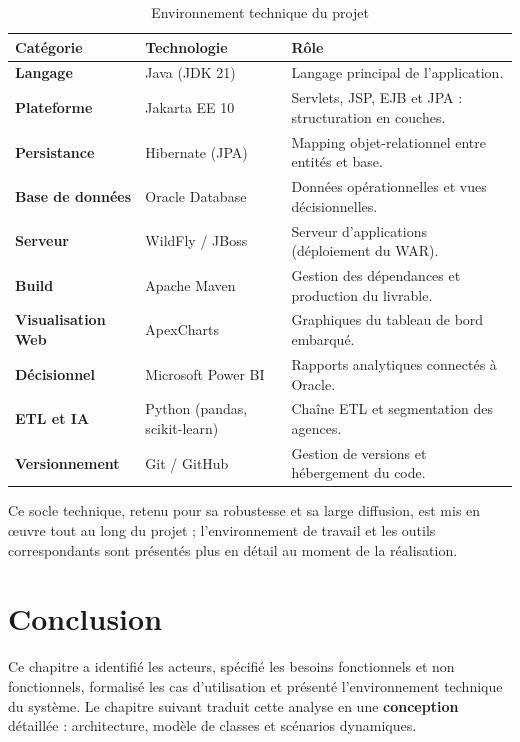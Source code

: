 \begin{table}[!htb]
\centering\small
\caption{Environnement technique du projet}
\label{tab:env_technique}
\renewcommand{\arraystretch}{1.15}
\begin{tabularx}{\textwidth}{|>{\bfseries}p{3.1cm}|>{\ttfamily}p{3.5cm}|X|}
\hline
\textmd{\textbf{Catégorie}} & \textmd{\textbf{Technologie}} & \textbf{Rôle}\\
\hline
Langage & Java (JDK 21) & Langage principal de l'application.\\
\hline
Plateforme & Jakarta EE 10 & Servlets, JSP, EJB et JPA : structuration en couches.\\
\hline
Persistance & Hibernate (JPA) & Mapping objet-relationnel entre entités et base.\\
\hline
Base de données & Oracle Database & Données opérationnelles et vues décisionnelles.\\
\hline
Serveur & WildFly / JBoss & Serveur d'applications (déploiement du WAR).\\
\hline
Build & Apache Maven & Gestion des dépendances et production du livrable.\\
\hline
Visualisation Web & ApexCharts & Graphiques du tableau de bord embarqué.\\
\hline
Décisionnel & Microsoft Power BI & Rapports analytiques connectés à Oracle.\\
\hline
ETL et IA & Python (pandas, scikit-learn) & Chaîne ETL et segmentation des agences.\\
\hline
Versionnement & Git / GitHub & Gestion de versions et hébergement du code.\\
\hline
\end{tabularx}
\end{table}

Ce socle technique, retenu pour sa robustesse et sa large diffusion, est mis en
œuvre tout au long du projet ; l'environnement de travail et les outils
correspondants sont présentés plus en détail au moment de la réalisation.

\section*{Conclusion}
Ce chapitre a identifié les acteurs, spécifié les besoins fonctionnels et non
fonctionnels, formalisé les cas d'utilisation et présenté l'environnement technique
du système. Le chapitre suivant traduit cette analyse en une \textbf{conception}
détaillée : architecture, modèle de classes et scénarios dynamiques.
